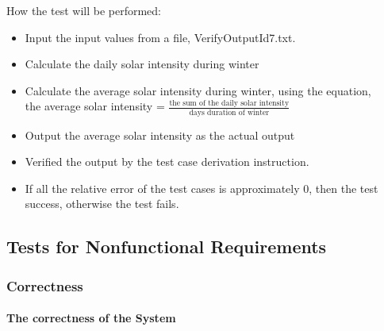 \documentclass[12pt, titlepage]{article}
\begin{document}
\begin{enumerate}

How the test will be performed: 

\begin{itemize} 
\item Input the input values from a file, VerifyOutputId7.txt. 
\item Calculate the daily solar intensity during winter 
\item Calculate the average solar intensity during winter, using the equation,\\the average solar intensity = $\frac{\text{the sum of the daily solar
intensity}}{\text{days duration of winter}}$
\item Output the average solar intensity as the actual output
\item Verified the output by the test case derivation instruction. 
\item If all the relative error of the test cases is approximately 0, then the
test success, otherwise the test fails.
\end{itemize}
\end{enumerate}

\subsection{Tests for Nonfunctional Requirements}

  \subsubsection{Correctness}
\paragraph{The correctness of the System}
\end{document}

